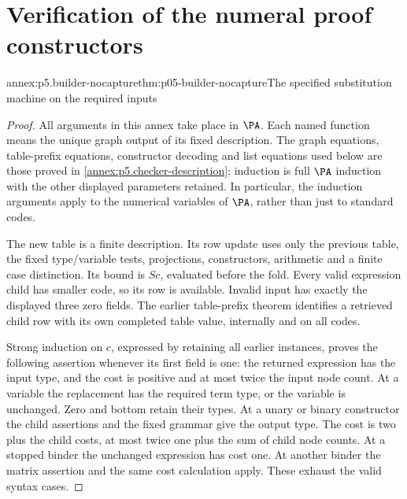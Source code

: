 \section{Verification of the numeral proof constructors}
\label{sec:annex-p05-pa-numeral-proof-builders}

\begin{annexitem}{annex:p5.builder-nocapture}{thm:p05-builder-nocapture}{The specified substitution machine on the required inputs}
\begin{proof}
All arguments in this annex take place in \(\PA\). Each named function
means the unique graph output of its fixed description. The graph equations,
table-prefix equations, constructor decoding and list equations used below
are those proved in \cref{annex:p5.checker-description}; induction is full
\(\PA\) induction with the other displayed parameters retained. In
particular, the induction arguments apply to the numerical variables of
\(\PA\), rather than just to standard codes.

The new table is a finite description. Its row update uses only the previous
table, the fixed type/variable tests, projections, constructors, arithmetic
and a finite case distinction. Its bound is \(Sc\), evaluated before the
fold. Every valid expression child has smaller code, so its row is available.
Invalid input has exactly the displayed three zero fields. The earlier
table-prefix theorem identifies a retrieved child row with its own completed
table value, internally and on all codes.

Strong induction on \(c\), expressed by retaining all earlier instances,
proves the following assertion whenever its first field is one: the returned
expression has the input type, and the cost is positive and at most twice
the input node count. At a variable the replacement has the required term
type, or the variable is unchanged. Zero and bottom retain their types.
At a unary or binary constructor the child assertions and the fixed grammar
give the output type. The cost is two plus the child costs, at most twice
one plus the sum of child node counts. At a stopped binder the unchanged
expression has cost one. At another binder the matrix assertion and the
same cost calculation apply. These exhaust the valid syntax cases.


\end{proof}
\end{annexitem}
